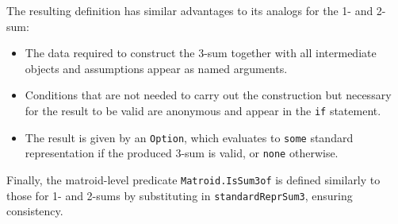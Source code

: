 The resulting definition has similar advantages to its analogs for the 1- and 2-sum:
\begin{itemize}
    \item The data required to construct the 3-sum together with all intermediate objects and assumptions appear as named arguments.
    \item Conditions that are not needed to carry out the construction but necessary for the result to be valid are anonymous and appear in the \texttt{if} statement.
    \item The result is given by an \texttt{Option}, which evaluates to \texttt{some} standard representation if the produced 3-sum is valid, or \texttt{none} otherwise.
\end{itemize}


Finally, the matroid-level predicate \texttt{Matroid.IsSum3of} is defined similarly to those for 1- and 2-sums by substituting in \texttt{standardReprSum3}, ensuring consistency.
